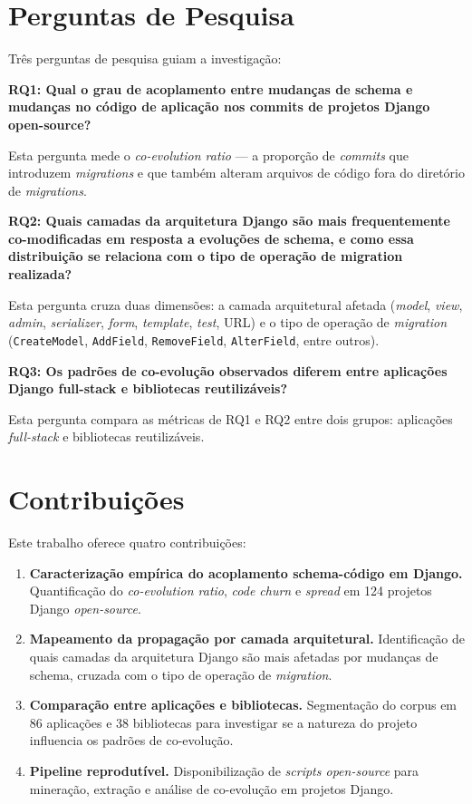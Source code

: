 \documentclass[
  12pt,
  openright,
  oneside,
  a4paper,
  brazil
]{abntex2}
\begin{document}
\section{Perguntas de Pesquisa}

Três perguntas de pesquisa guiam a investigação:

\textbf{RQ1: Qual o grau de acoplamento entre mudanças de schema e mudanças no código de aplicação nos commits de projetos Django open-source?}

Esta pergunta mede o \textit{co-evolution ratio} --- a proporção de \textit{commits} que introduzem \textit{migrations} e que também alteram arquivos de código fora do diretório de \textit{migrations}.

\textbf{RQ2: Quais camadas da arquitetura Django são mais frequentemente co-modificadas em resposta a evoluções de schema, e como essa distribuição se relaciona com o tipo de operação de migration realizada?}

Esta pergunta cruza duas dimensões: a camada arquitetural afetada (\textit{model}, \textit{view}, \textit{admin}, \textit{serializer}, \textit{form}, \textit{template}, \textit{test}, URL) e o tipo de operação de \textit{migration} (\texttt{CreateModel}, \texttt{AddField}, \texttt{RemoveField}, \texttt{AlterField}, entre outros).

\textbf{RQ3: Os padrões de co-evolução observados diferem entre aplicações Django full-stack e bibliotecas reutilizáveis?}

Esta pergunta compara as métricas de RQ1 e RQ2 entre dois grupos: aplicações \textit{full-stack} e bibliotecas reutilizáveis.

\section{Contribuições}

Este trabalho oferece quatro contribuições:

\begin{enumerate}
  \item \textbf{Caracterização empírica do acoplamento schema-código em Django.} Quantificação do \textit{co-evolution ratio}, \textit{code churn} e \textit{spread} em 124 projetos Django \textit{open-source}.
  \item \textbf{Mapeamento da propagação por camada arquitetural.} Identificação de quais camadas da arquitetura Django são mais afetadas por mudanças de schema, cruzada com o tipo de operação de \textit{migration}.
  \item \textbf{Comparação entre aplicações e bibliotecas.} Segmentação do corpus em 86 aplicações e 38 bibliotecas para investigar se a natureza do projeto influencia os padrões de co-evolução.
  \item \textbf{Pipeline reprodutível.} Disponibilização de \textit{scripts open-source} para mineração, extração e análise de co-evolução em projetos Django.
\end{enumerate}
\end{document}
